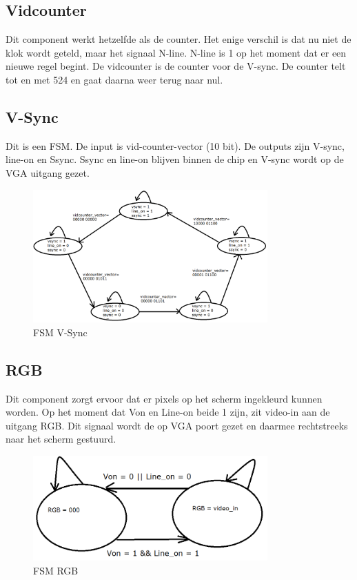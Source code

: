 \documentclass[oneside,dutch]{tudelft-report}
\begin{document}
\subsection{Vidcounter}
Dit component werkt hetzelfde als de counter. Het enige verschil is dat nu niet de klok wordt geteld, maar het signaal N-line. N-line is 1 op het moment dat er een nieuwe regel begint. De vidcounter is de counter voor de V-sync. De counter telt tot en met 524 en gaat daarna weer terug naar nul.

\subsection{V-Sync}
Dit is een FSM. De input is vid-counter-vector (10 bit). De outputs zijn V-sync, line-on en Ssync. Ssync en line-on blijven binnen de chip en V-sync wordt op de VGA uitgang gezet.

\begin{figure}[H]
\center
\includegraphics[width=9cm]{FSM-V-sync}
\caption{FSM V-Sync}
\label{VGA}
\end{figure}

\subsection{RGB}
Dit component zorgt ervoor dat er pixels op het scherm ingekleurd kunnen worden. Op het moment dat Von en Line-on beide 1 zijn, zit video-in aan de uitgang RGB. Dit signaal wordt de op VGA poort gezet en daarmee rechtstreeks naar het scherm gestuurd. 

\begin{figure}[H]
\center
\includegraphics[width=9cm]{FSM-rgb}
\caption{FSM RGB}
\label{VGA}
\end{figure}
\end{document}

